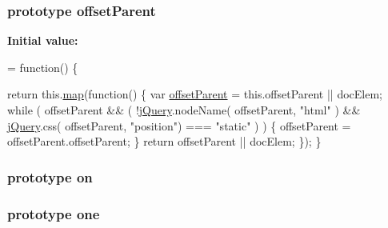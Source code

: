 \hypertarget{jquery-1_810_82-vsdoc_8js_a2d4c0b0aec0a3b2c4e287976b2587d82}{
\subsubsection[{offset\-Parent}]{ {\bf prototype} offset\-Parent}}\label{jquery-1_810_82-vsdoc_8js_a2d4c0b0aec0a3b2c4e287976b2587d82}
{\bfseries Initial value\-:}
\begin{DoxyCode}
= \textcolor{keyword}{function}() \{


        \textcolor{keywordflow}{return} this.\hyperlink{jquery-1_810_82-vsdoc_8js_a20838f8c4bedc779e51bf830f5a4d471}{map}(\textcolor{keyword}{function}() \{
            var \hyperlink{jquery-1_810_82-vsdoc_8js_a2d4c0b0aec0a3b2c4e287976b2587d82}{offsetParent} = this.offsetParent || docElem;
            \textcolor{keywordflow}{while} ( offsetParent && ( !\hyperlink{jquery-1_810_82-vsdoc_8js_add5237586d970a38a81f990e8eb28c6c}{jQuery}.nodeName( offsetParent, \textcolor{stringliteral}{"html"} ) && 
      \hyperlink{jquery-1_810_82-vsdoc_8js_add5237586d970a38a81f990e8eb28c6c}{jQuery}.css( offsetParent, \textcolor{stringliteral}{"position"}) === \textcolor{stringliteral}{"static"} ) ) \{
                offsetParent = offsetParent.offsetParent;
            \}
            \textcolor{keywordflow}{return} offsetParent || docElem;
        \});
    \}
\end{DoxyCode}
\hypertarget{jquery-1_810_82-vsdoc_8js_ae453b412b883f60220d73468ef6c6dbc}{
\subsubsection[{on}]{ {\bf prototype} on}}\label{jquery-1_810_82-vsdoc_8js_ae453b412b883f60220d73468ef6c6dbc}
\hypertarget{jquery-1_810_82-vsdoc_8js_a4b549c0fa19045218624f5384762bf17}{
\subsubsection[{one}]{ {\bf prototype} one}}\label{jquery-1_810_82-vsdoc_8js_a4b549c0fa19045218624f5384762bf17}

